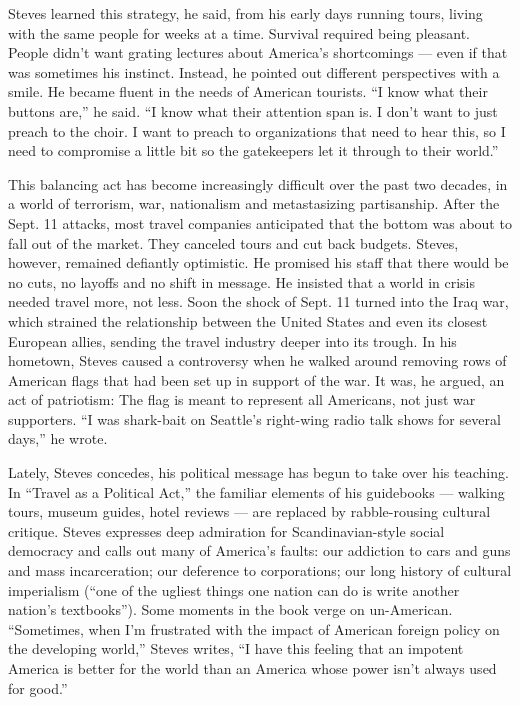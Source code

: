 Steves learned this strategy, he said, from his early days running
tours, living with the same people for weeks at a time. Survival
required being pleasant. People didn't want grating lectures about
America's shortcomings --- even if that was sometimes his instinct.
Instead, he pointed out different perspectives with a smile. He became
fluent in the needs of American tourists. ``I know what their buttons
are,'' he said. ``I know what their attention span is. I don't want to
just preach to the choir. I want to preach to organizations that need to
hear this, so I need to compromise a little bit so the gatekeepers let
it through to their world.''

This balancing act has become increasingly difficult over the past two
decades, in a world of terrorism, war, nationalism and metastasizing
partisanship. After the Sept. 11 attacks, most travel companies
anticipated that the bottom was about to fall out of the market. They
canceled tours and cut back budgets. Steves, however, remained defiantly
optimistic. He promised his staff that there would be no cuts, no
layoffs and no shift in message. He insisted that a world in crisis
needed travel more, not less. Soon the shock of Sept. 11 turned into the
Iraq war, which strained the relationship between the United States and
even its closest European allies, sending the travel industry deeper
into its trough. In his hometown, Steves caused a controversy when he
walked around removing rows of American flags that had been set up in
support of the war. It was, he argued, an act of patriotism: The flag is
meant to represent all Americans, not just war supporters. ``I was
shark-bait on Seattle's right-wing radio talk shows for several days,''
he wrote.

Lately, Steves concedes, his political message has begun to take over
his teaching. In ``Travel as a Political Act,'' the familiar elements of
his guidebooks --- walking tours, museum guides, hotel reviews --- are
replaced by rabble-rousing cultural critique. Steves expresses deep
admiration for Scandinavian-style social democracy and calls out many of
America's faults: our addiction to cars and guns and mass incarceration;
our deference to corporations; our long history of cultural imperialism
(``one of the ugliest things one nation can do is write another nation's
textbooks''). Some moments in the book verge on un-American.
``Sometimes, when I'm frustrated with the impact of American foreign
policy on the developing world,'' Steves writes, ``I have this feeling
that an impotent America is better for the world than an America whose
power isn't always used for good.''

